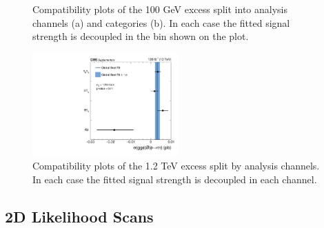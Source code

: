 \begin{figure}[!hbtp]
\centering
\caption{Compatibility plots of the 100 GeV excess split into analysis channels (a) and categories (b). In each case the fitted signal strength is decoupled in the bin shown on the plot.}
\label{fig:low_mass_compatibility}
\end{figure}

\begin{figure}[!hbtp]
\centering
    \includegraphics[width=0.5\textwidth]{Figures/ccc_fit_result_mH1200_per-channel.pdf}
\caption{Compatibility plots of the 1.2 TeV excess split by analysis channels. In each case the fitted signal strength is decoupled in each channel.}
\label{fig:high_mass_compatibility}
\end{figure}

\subsection{2D Likelihood Scans}

